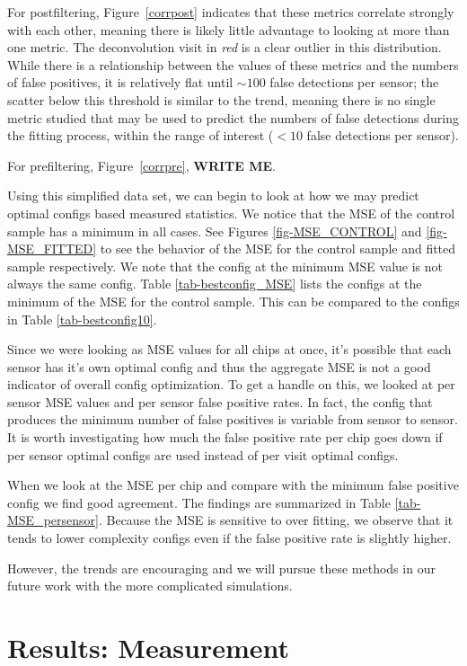 \documentclass[prd, nofootinbib, floatfix, 11pt,tightenlines,times]{article}
\begin{document}
For postfiltering, Figure~\ref{corrpost} indicates that these metrics
correlate strongly with each other, meaning there is likely little
advantage to looking at more than one metric.  The deconvolution visit
in {\it red} is a clear outlier in this distribution.  While there is
a relationship between the values of these metrics and the numbers of
false positives, it is relatively flat until $\sim 100$ false
detections per sensor; the scatter below this threshold is similar to
the trend, meaning there is no single metric studied that may be used
to predict the numbers of false detections during the fitting process,
within the range of interest ($<10$ false detections per sensor).

For prefiltering, Figure~\ref{corrpre}, {\bf WRITE ME}.

Using this simplified data set, we can begin to look at how we may predict 
optimal configs based measured statistics.  We notice that the MSE of the
control sample has a minimum in all cases.  See Figures \ref{fig-MSE_CONTROL}
and \ref{fig-MSE_FITTED} to see the behavior of the MSE for the control sample and
fitted sample respectively.  We note that the config at the minimum MSE value is
not always the same config.  Table \ref{tab-bestconfig_MSE} lists the configs
at the minimum of the MSE for the control sample.  This can be compared to
the configs in Table \ref{tab-bestconfig10}.

Since we were looking as MSE values for all chips at once, it's possible that
each sensor has it's own optimal config and thus the aggregate MSE is not a 
good indicator of overall config optimization.  To get a handle on this, we
looked at per sensor MSE values and per sensor false positive rates.  In fact,
the config that produces the minimum number of false positives is variable
from sensor to sensor.  It is worth investigating how much the false positive rate
per chip goes down if per sensor optimal configs are used instead of per visit optimal
configs.

When we look at the MSE per chip and compare with the minimum false positive config we 
find good agreement.  The findings are summarized in Table \ref{tab-MSE_persensor}.  Because
the MSE is sensitive to over fitting, we observe that it tends to lower complexity configs
even if the false positive rate is slightly higher.

However, the trends are encouraging and we will pursue these methods
in our future work with the more complicated simulations.

\section{Results: Measurement}
\end{document}
